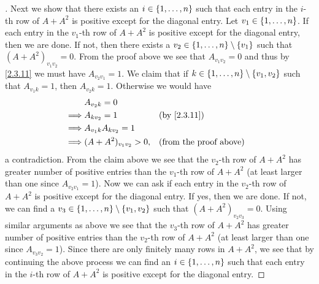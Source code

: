 \begin{proof}[]
  Next we show that there exists an \(i \in \left\lbrace1, \dots, n\right\rbrace\) such that each entry in the \(i\)-th row of \(A + A^2\) is positive except for the diagonal entry.
  Let \(v_1 \in \left\lbrace1, \dots, n\right\rbrace\).
  If each entry in the \(v_1\)-th row of \(A + A^2\) is positive except for the diagonal entry, then we are done.
  If not, then there exists a \(v_2 \in \left\lbrace1, \dots, n\right\rbrace \setminus \left\lbrace v_1\right\rbrace\) such that \((A + A^2)_{v_1 v_2} = 0\).
  From the proof above we see that \(A_{v_1 v_2} = 0\) and thus by \cref{2.3.11} we must have \(A_{v_2 v_1} = 1\).
  We claim that if \(k \in \left\lbrace1, \dots, n\right\rbrace \setminus \left\lbrace v_1, v_2\right\rbrace\) such that \(A_{v_1 k} = 1\), then \(A_{v_2 k} = 1\).
  Otherwise we would have
  \begin{align*}
             & A_{v_2 k} = 0                                               \\
    \implies & A_{k v_2} = 1            &  & \by{2.3.11}                   \\
    \implies & A_{v_1 k} A_{k v_2} = 1                                     \\
    \implies & (A + A^2)_{v_1 v_2} > 0, &  & \text{(from the proof above)}
  \end{align*}
  a contradiction.
  From the claim above we see that the \(v_2\)-th row of \(A + A^2\) has greater number of positive entries than the \(v_1\)-th row of \(A + A^2\) (at least larger than one since \(A_{v_2 v_1} = 1\)).
  Now we can ask if each entry in the \(v_2\)-th row of \(A + A^2\) is positive except for the diagonal entry.
  If yes, then we are done.
  If not, we can find a \(v_3 \in \left\lbrace1, \dots, n\right\rbrace \setminus \left\lbrace v_1, v_2\right\rbrace\) such that \((A + A^2)_{v_2 v_3} = 0\).
  Using similar arguments as above we see that the \(v_3\)-th row of \(A + A^2\) has greater number of positive entries than the \(v_2\)-th row of \(A + A^2\) (at least larger than one since \(A_{v_3 v_2} = 1\)).
  Since there are only finitely many rows in \(A + A^2\), we see that by continuing the above process we can find an \(i \in \left\lbrace1, \dots, n\right\rbrace\) such that each entry in the \(i\)-th row of \(A + A^2\) is positive except for the diagonal entry.


\end{proof}
